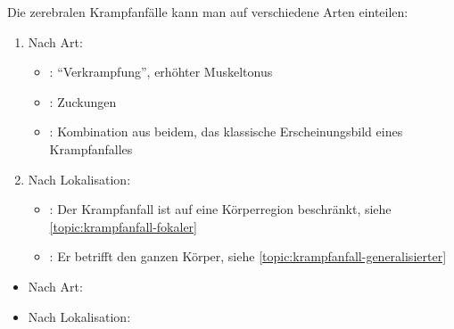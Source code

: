 {%
Die zerebralen Krampfanfälle kann man auf verschiedene Arten
einteilen:

\begin{enumerate}
  \item Nach Art:
  \begin{itemize}
    \item {}: \enquote{Verkrampfung}, erhöhter
    Muskeltonus
    \item {}: Zuckungen
    \item {}: Kombination aus beidem, das
    klassische Erscheinungsbild eines Krampfanfalles
  \end{itemize}
  \item Nach Lokalisation:
  \begin{itemize}
    \item {}: Der Krampfanfall ist auf
    eine Körperregion beschränkt, siehe
    \ref{topic:krampfanfall-fokaler}
    \item {}: Er betrifft den
    ganzen Körper, siehe
    \ref{topic:krampfanfall-generalisierter}
    
  \end{itemize}
\end{enumerate}
}{%
\begin{itemize}
  \item Nach Art:
  \item Nach Lokalisation:
\end{itemize}
}{}{}{}

